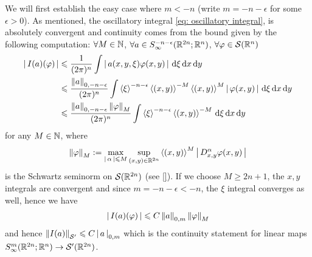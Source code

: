 \documentclass[12pt]{article}
\begin{document}
We will first establish the easy case where $m < -n$ (write $m = -n - \epsilon$ for some $\epsilon > 0$). As mentioned, the oscillatory integral \ref{eq: oscillatory integral}, is absolutely convergent and continuity comes from the bound given by the following computation: $\forall M \in \N$, $\forall a \in S^{-n -\epsilon}_\infty(\R^{2n}; \R^n)$, $\forall \varphi \in \sch(\R^n)$ 
\begin{align*}
    \abs{I(a)(\varphi)}
    & \leq \frac{1}{(2\pi)^n} \int \abs{a(x, y, \xi) \varphi(x, y)} \d[\xi] \d[x] \d[y]\\
    & \leq \frac{\norm[a]_{0, -n -\epsilon}}{(2\pi)^n} \int \sym[\xi]^{-n -\epsilon} \sym[(x, y)]^{-M} \sym[(x, y)]^{M} \abs{\varphi(x, y)} \d[\xi] \d[x] \d[y]\\
    & \leq \frac{\norm[a]_{0, -n -\epsilon} \norm[\varphi]_M}{(2\pi)^n} \int \sym[\xi]^{-n -\epsilon} \sym[(x, y)]^{-M}  \d[\xi] \d[x] \d[y]\\
\end{align*}
for any $M \in \N$, where 
\begin{align} \label{eq: Schwartz seminorm} 
    \norm[\varphi]_M :=  \max_{\abs{\alpha} \leq M}  \sup_{(x, y) \in \R^{2n}} \sym[(x, y)]^M \abs{D^{\alpha}_{x, y} \varphi(x, y)}
\end{align}
is the Schwartz  seminorm on $\sch(\R^{2n})$ (see \ref{}). If we choose $M \geq 2n +1$, the $x, y$ integrals are convergent and since $m = -n -\epsilon < -n$, the $\xi$ integral converges as well, hence we have 
\begin{align*}
    \abs{I(a)(\varphi)} \leq C \norm[a]_{0, m} \norm[\varphi]_M
\end{align*}
and hence $\norm[I(a)]_{\sch'} \leq C \abs{a}_{0, m}$ which is the continuity statement for linear maps $S^{m}_{\infty}(\R^{2n}; \R^{n}) \to \sch'(\R^{2n})$. \\
\end{document}
